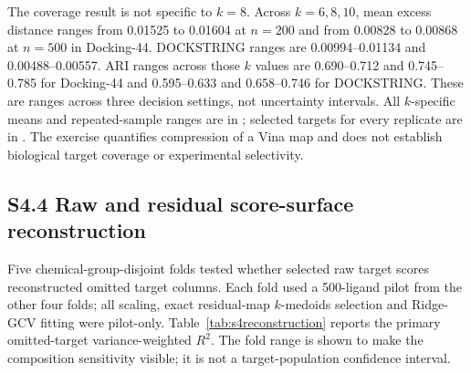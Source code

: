 \documentclass[11pt]{article}
\begin{document}
\begin{table}[htbp]
\centering
\caption{Eight-target decision recovery. Values are means over 100 pilots;
brackets are central 95\% repeated-sample ranges. ``Random no worse'' is the
fraction of random eight-target panels with mean complement-map coverage
distance no greater than the pilot panel.}
\label{tab:s4decision}
\small
{}
\end{table}

The coverage result is not specific to $k=8$. Across $k=6,8,10$, mean excess
distance ranges from 0.01525 to 0.01604 at $n=200$ and from 0.00828 to 0.00868
at $n=500$ in Docking-44. DOCKSTRING ranges are 0.00994--0.01134 and
0.00488--0.00557. ARI ranges across those $k$ values are 0.690--0.712 and
0.745--0.785 for Docking-44 and 0.595--0.633 and 0.658--0.746 for
DOCKSTRING. These are ranges across three decision settings, not uncertainty
intervals. All $k$-specific means and repeated-sample ranges are in
;
selected targets for every replicate are in
.
The exercise quantifies compression of a Vina map and does not establish
biological target coverage or experimental selectivity.

\subsection*{S4.4 Raw and residual score-surface reconstruction}

Five chemical-group-disjoint folds tested whether selected raw target scores
reconstructed omitted target columns. Each fold used a 500-ligand pilot from
the other four folds; all scaling, exact residual-map $k$-medoids selection and
Ridge-GCV fitting were pilot-only. Table~\ref{tab:s4reconstruction} reports the
primary omitted-target variance-weighted $R^2$. The fold range is shown to make
the composition sensitivity visible; it is not a target-population confidence
interval.
\end{document}
